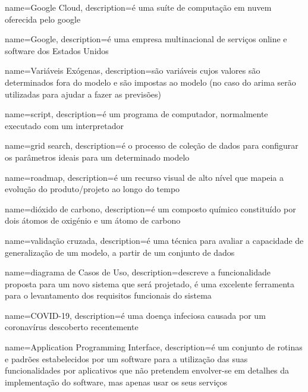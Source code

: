 {
    name={Google Cloud},
    description={é uma suíte de computação em nuvem oferecida pelo \gls{google}}
}

{
    name={Google},
    description={é uma empresa multinacional de serviços online e software dos
    Estados Unidos}
}

{
    name={Variáveis Exógenas},
    description={são variáveis cujos valores são determinados fora do modelo e são
    impostas ao modelo (no caso do \acrshort{arima} serão utilizadas para ajudar a fazer
    as previsões)}
}

{
    name={script},
    description={é um programa de computador, normalmente executado com um interpretador}
}

{
    name={grid search},
    description={é o processo de coleção de dados para configurar os parâmetros ideais para
    um determinado modelo}
}

{
    name={roadmap},
    description={é um recurso visual de alto nível que mapeia a evolução do produto/projeto
    ao longo do tempo}
}

{
    name={dióxido de carbono},
    description={é um composto químico constituído por dois átomos de oxigénio e um átomo
    de carbono}
}

{
    name={validação cruzada},
    description={é uma técnica para avaliar a capacidade de generalização de um modelo, a
    partir de um conjunto de dados}
}

{
    name={diagrama de Casos de Uso},
    description={descreve a funcionalidade proposta para um novo sistema que será projetado,
    é uma excelente ferramenta para o levantamento dos requisitos funcionais do sistema}
}

{
    name={COVID-19},
    description={é uma doença infeciosa causada por um coronavírus descoberto recentemente}
}

{
    name={Application Programming Interface},
    description={é um conjunto de rotinas e padrões estabelecidos por um software para a
    utilização das suas funcionalidades por aplicativos que não pretendem envolver-se em
    detalhes da implementação do software, mas apenas usar os seus serviços}
}

